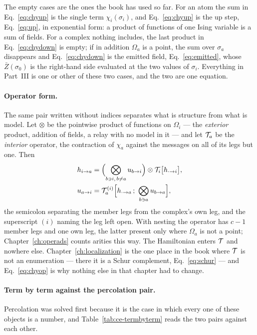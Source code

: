 The empty cases are the ones the book has used so far. For an atom the sum in
Eq.~\eqref{eq:chyup} is the single term $\chi_{i}(\sigma_{i})$, and
Eq.~\eqref{eq:chyup} is the up step, Eq.~\eqref{eq:up}, in exponential form:
a product of functions of one Ising variable is a sum of fields. For a complex
nothing includes, the last product in Eq.~\eqref{eq:chydown} is empty; if in
addition $\Omega_{a}$ is a point, the sum over $\sigma_{a}$ disappears and
Eq.~\eqref{eq:chydown} is the emitted field, Eq.~\eqref{eq:emitted}, whose
$\bar Z(\sigma_{0})$ is the right-hand side evaluated at the two values of
$\sigma_{i}$. Everything in Part~III is one or other of these two cases, and
the two are one equation.

\paragraph{Operator form.} The same pair written without indices separates
what is structure from what is model. Let $\otimes$ be the pointwise product
of functions on $\Omega_{i}$ --- the \emph{exterior} product, addition of
fields, a relay with no model in it --- and let $\mathcal{T}_{a}$ be the
\emph{interior} operator, the contraction of $\chi_{a}$ against the messages
on all of its legs but one. Then
\begin{equation}
  \begin{aligned}
  h_{i\to a}
    &=\Bigl(\bigotimes_{b\ni i,\,b\ne a} u_{b\to i}\Bigr)\otimes
      \mathcal{T}_{i}\bigl[h_{\cdot\to i}\bigr],\\
  u_{a\to i}
    &=\mathcal{T}^{(i)}_{a}\Bigl[h_{\cdot\to a}\,;\ \bigotimes_{b\ni a}u_{b\to a}\Bigr],
  \end{aligned}
  \label{eq:chyop}
\end{equation}
the semicolon separating the member legs from the complex's own leg, and the
superscript $(i)$ naming the leg left open. With nesting the operator has
$c-1$ member legs and one own leg, the latter present only where
$\Omega_{a}$ is not a point; Chapter~\ref{ch:operads} counts arities this
way. The Hamiltonian enters $\mathcal{T}$ and
nowhere else. Chapter~\ref{ch:localization} is the one place in the book
where $\mathcal{T}$ is not an enumeration --- there it is a Schur complement,
Eq.~\eqref{eq:schur} --- and Eq.~\eqref{eq:chyop} is why nothing else in that
chapter had to change.

\paragraph{Term by term against the percolation pair.} Percolation was solved
first because it is the case in which every one of these objects is a
number, and Table~\ref{tab:ce-termbyterm} reads the two pairs against each
other.

